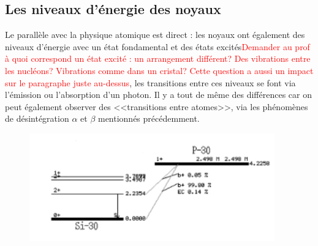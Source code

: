 \subsection{Les niveaux d'énergie des noyaux}
Le parallèle avec la physique atomique est direct : les noyaux ont également des niveaux d'énergie avec un état fondamental et des états excités\textcolor{red}{Demander au prof à quoi correspond un état excité : un arrangement différent? Des vibrations entre les nucléons? Vibrations comme dans un cristal? Cette question a aussi un impact sur le paragraphe juste au-dessus}, les transitions entre ces niveaux se font via l'émission ou l'absorption d'un photon. Il y a tout de même des différences car on peut également observer des <<transitions entre atomes>>, via les phénomènes de désintégration $\alpha$ et $\beta$ mentionnés précédemment.

\begin{figure}[H]
    \centering
    \includegraphics[scale=1.3]{Images4/NiveauxAtomes.PNG}
\end{figure}

